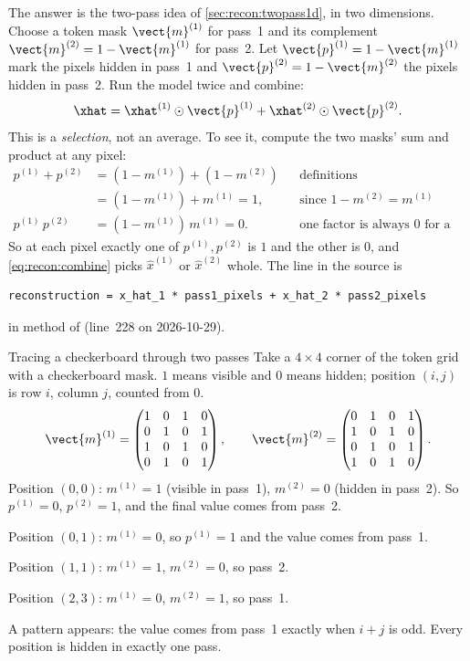 The answer is the two-pass idea of \cref{sec:recon:twopass1d}, in two dimensions. Choose a token
mask $\vect{m}^{(1)}$ for pass~1 and its complement $\vect{m}^{(2)} = 1 - \vect{m}^{(1)}$ for pass~2.
Let $\vect{p}^{(1)} = 1-\vect{m}^{(1)}$ mark the pixels hidden in pass~1 and $\vect{p}^{(2)} =
1-\vect{m}^{(2)}$ the pixels hidden in pass~2. Run the model twice and combine:
\begin{equation}\label{eq:recon:combine}
\xhat = \xhat^{(1)}\odot\vect{p}^{(1)} + \xhat^{(2)}\odot\vect{p}^{(2)}.
\end{equation}
This is a \emph{selection}, not an average. To see it, compute the two masks' sum and product at any
pixel:
\begin{align*}
p^{(1)} + p^{(2)} &= (1-m^{(1)}) + (1-m^{(2)})
  && \text{definitions}\\
&= (1-m^{(1)}) + m^{(1)} = 1,
  && \text{since } 1-m^{(2)} = m^{(1)}\\
p^{(1)}\,p^{(2)} &= (1-m^{(1)})\,m^{(1)} = 0.
  && \text{one factor is always 0 for a 0/1 value}
\end{align*}
So at each pixel exactly one of $p^{(1)},p^{(2)}$ is $1$ and the other is $0$, and \cref{eq:recon:combine}
picks $\hat{x}^{(1)}$ or $\hat{x}^{(2)}$ whole. The line in the source is
\begin{lstlisting}
reconstruction = x_hat_1 * pass1_pixels + x_hat_2 * pass2_pixels
\end{lstlisting}
in method  of 
(line~228 on 2026-10-29).

\begin{worked}[label={we:recon:checker}]{Tracing a checkerboard through two passes}
Take a $4\times4$ corner of the token grid with a checkerboard mask. $1$ means visible and $0$ means
hidden; position $(i,j)$ is row $i$, column $j$, counted from $0$.
\[
\vect{m}^{(1)} = \begin{pmatrix}1&0&1&0\\0&1&0&1\\1&0&1&0\\0&1&0&1\end{pmatrix},\qquad
\vect{m}^{(2)} = \begin{pmatrix}0&1&0&1\\1&0&1&0\\0&1&0&1\\1&0&1&0\end{pmatrix}.
\]
Position $(0,0)$: $m^{(1)}=1$ (visible in pass~1), $m^{(2)}=0$ (hidden in pass~2). So
$p^{(1)} = 0$, $p^{(2)} = 1$, and the final value comes from pass~2.

Position $(0,1)$: $m^{(1)}=0$, so $p^{(1)}=1$ and the value comes from pass~1.

Position $(1,1)$: $m^{(1)}=1$, $m^{(2)}=0$, so pass~2.

Position $(2,3)$: $m^{(1)}=0$, $m^{(2)}=1$, so pass~1.

A pattern appears: the value comes from pass~1 exactly when $i+j$ is odd. Every position is hidden in
exactly one pass.
\end{worked}

